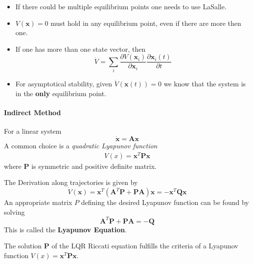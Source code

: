 \newpar{}
\begin{itemize}
    \item If there could be multiple equilibrium points one needs to use LaSalle.
    \item $V(\mathbf{x})=0$ must hold in any equilibrium point, even if there are more then one.
    \item If one has more than one state vector, then
          \begin{equation*}
              \dot{V}=\sum_{i} \frac{\partial V(\mathbf{x}_i)}{\partial \mathbf{x}_i} \frac{\partial \mathbf{x}_i(t)}{\partial t}
          \end{equation*}
    \item For asymptotical stability, given $\dot{V}(\mathbf{x}(t)) = 0$ we know that the system is in the \textbf{only} equilibrium point.
\end{itemize}

\paragraph{Indirect Method}
For a linear system
\begin{equation*}
    \dot{\mathbf{x}} = \mathbf{Ax}
\end{equation*}
A common choice is a \textit{quadratic Lyapunov function}
\begin{align*}
    V(x) = \mathbf{x}^{T}\mathbf{Px}
\end{align*}
where $\mathbf{P}$ is symmetric and positive definite matrix.

The Derivation along trajectories is given by
\begin{equation*}
    \dot{V}(\mathbf{x}) = \mathbf{x}^{T}\left(\mathbf{A}^{T}\mathbf{P+PA}\right)\mathbf{x} = - \mathbf{x}^{T}\mathbf{Qx}
\end{equation*}
An appropriate matrix $P$ defining the desired Lyapunov function can be found by solving
\begin{equation*}
    \mathbf{A}^{T}\mathbf{P+PA=-Q}
\end{equation*}
This is called the \textbf{Lyapunov Equation}.

\newpar{}

The solution $\mathbf{P}$ of the LQR Riccati equation fulfills the criteria of a Lyapunov function $V(x) = \mathbf{x}^{T}\mathbf{Px}$.

